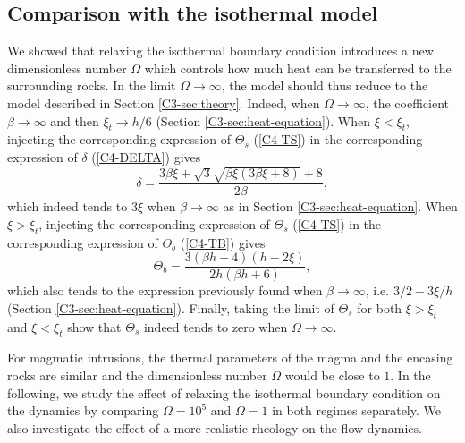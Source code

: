 \subsection{Comparison with the isothermal model}
\label{C4-sec:some-limits}

We showed that relaxing the isothermal boundary condition introduces a
new dimensionless number $\Omega$ which  controls how much heat can be
transferred    to   the    surrounding    rocks.     In   the    limit
$\Omega \rightarrow \infty$, the model should thus reduce to the model
described    in    Section    \ref{C3-sec:theory}.     Indeed,    when
$\Omega\rightarrow \infty$, the  coefficient $\beta\rightarrow \infty$
and then $\xi_t\rightarrow  h/6$ (Section \ref{C3-sec:heat-equation}).
When $\xi<\xi_t$, injecting the corresponding expression of $\Theta_s$
(\ref{C4-TS})   in   the    corresponding   expression   of   $\delta$
(\ref{C4-DELTA}) gives
\begin{equation}
  \delta =\frac{3 \beta \xi +\sqrt{3} \sqrt{\beta \xi (3 \beta \xi +8)}+8}{2 \beta },
\end{equation}
which indeed  tends to  $3\xi$ when $\beta  \rightarrow \infty$  as in
Section \ref{C3-sec:heat-equation}.   When $\xi>\xi_t$,  injecting the
corresponding   expression   of   $\Theta_s$  (\ref{C4-TS})   in   the
corresponding expression of $\Theta_b$ (\ref{C4-TB}) gives
\begin{equation}
  \Theta_b = \frac{3 (\beta  h+4) (h-2 \xi )}{2 h (\beta  h+6)},
\end{equation}
which   also   tends  to   the   expression   previously  found   when
$\beta    \rightarrow    \infty$,    i.e.     $3/2-3\xi/h$    (Section
\ref{C3-sec:heat-equation}). Finally,  taking the limit  of $\Theta_s$
for both $\xi>\xi_t$ and $\xi<\xi_t$ show that $\Theta_s$ indeed tends
to zero when $\Omega\rightarrow \infty$.

For magmatic intrusions,  the thermal parameters of the  magma and the
encasing rocks are similar and the dimensionless  number $\Omega$ would
be close to $1$. In the following, we study the effect of relaxing the
isothermal   boundary  condition   on   the   dynamics  by   comparing
$\Omega=10^5$ and  $\Omega = 1$  in both regimes separately.   We also
investigate  the effect  of  a  more realistic  rheology  on the  flow
dynamics.

